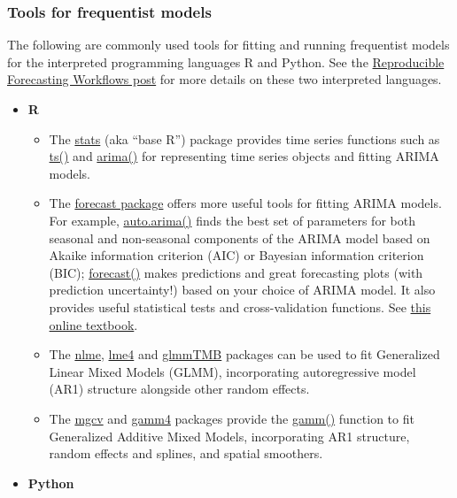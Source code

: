 \documentclass[
]{book}
\providecommand{\tightlist}{%
  \setlength{\itemsep}{0pt}\setlength{\parskip}{0pt}}
\begin{document}
\hypertarget{tools-for-frequentist-models}{%
\subsubsection{Tools for frequentist models}\label{tools-for-frequentist-models}}

The following are commonly used tools for fitting and running frequentist models for the interpreted programming languages R and Python. See the \href{https://ecoforecast.org/reproducible-forecasting-workflows/\#scripted}{Reproducible Forecasting Workflows post} for more details on these two interpreted languages.

\begin{itemize}
\tightlist
\item
  \textbf{R}

  \begin{itemize}
  \tightlist
  \item
    The \href{https://stat.ethz.ch/R-manual/R-devel/library/stats/html/00Index.html}{stats} (aka ``base R'') package provides time series functions such as \href{https://stat.ethz.ch/R-manual/R-devel/library/stats/html/ts.html}{ts()} and \href{https://stat.ethz.ch/R-manual/R-devel/library/stats/html/arima0.html}{arima()} for representing time series objects and fitting ARIMA models.\\
  \item
    The \href{https://cran.r-project.org/web/packages/forecast/index.html}{forecast package} offers more useful tools for fitting ARIMA models. For example, \href{https://www.rdocumentation.org/packages/forecast/versions/8.14/topics/auto.arima}{auto.arima()} finds the best set of parameters for both seasonal and non-seasonal components of the ARIMA model based on Akaike information criterion (AIC) or Bayesian information criterion (BIC); \href{https://www.rdocumentation.org/packages/forecast/versions/8.14/topics/forecast}{forecast()} makes predictions and great forecasting plots (with prediction uncertainty!) based on your choice of ARIMA model. It also provides useful statistical tests and cross-validation functions. See \href{https://otexts.com/fpp2/arima.html}{this online textbook}.\\
  \item
    The \href{https://cran.r-project.org/web/packages/nlme/index.html}{nlme}, \href{https://cran.r-project.org/web/packages/glmmTMB/index.html}{lme4} and \href{https://cran.r-project.org/web/packages/glmmTMB/index.html}{glmmTMB} packages can be used to fit Generalized Linear Mixed Models (GLMM), incorporating autoregressive model (AR1) structure alongside other random effects.
  \item
    The \href{https://cran.r-project.org/web/packages/mgcv/index.html}{mgcv} and \href{https://cran.r-project.org/web/packages/gamm4/index.html}{gamm4} packages provide the \href{https://www.rdocumentation.org/packages/mgcv/versions/1.8-35/topics/gamm}{gamm()} function to fit Generalized Additive Mixed Models, incorporating AR1 structure, random effects and splines, and spatial smoothers.
  \end{itemize}
\item
  \textbf{Python}


\end{itemize}
\end{document}
